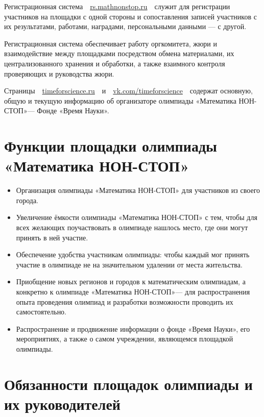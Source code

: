\documentclass[a4paper,12pt]{article}
\newcommand{\mns}{«Математика НОН-СТОП»\xspace}
\begin{document}
Регистрационная система\ \ \url{rs.mathnonstop.ru}\ \ служит для регистрации участников на площадки с одной стороны и сопоставления записей участников с их результатами, работами, наградами, персональными данными — с другой.

Регистрационная система обеспечивает работу оргкомитета, жюри и взаимодействие между площадками посредством обмена материалами, их централизованного хранения и обработки, а также взаимного контроля проверяющих и руководства жюри.

Страницы\ \ \url{timeforscience.ru}\ \ и\ \ \url{vk.com/timeforscience}\ \ содержат основную, общую и текущую информацию об организаторе олимпиады \mns — Фонде «Время Науки».

\section{Функции площадки олимпиады \mns}

\begin{itemize}
	\item Организация олимпиады \mns для участников из своего города.
	\item Увеличение ёмкости олимпиады \mns с тем, чтобы для всех желающих поучаствовать в олимпиаде нашлось место, где они могут принять в ней участие.
	\item Обеспечение удобства участникам олимпиады: чтобы каждый мог принять участие в олимпиаде не на значительном удалении от места жительства.
	\item Приобщение новых регионов и городов к математическим олимпиадам, а конкретно к олимпиаде \mns — для распространения опыта проведения олимпиад и разработки возможности проводить их самостоятельно.
	\item Распространение и продвижение информации о фонде «Время Науки», его мероприятиях, а также о самом учреждении, являющемся площадкой олимпиады.
\end{itemize}

\section{Обязанности площадок олимпиады и их руководителей}
\end{document}
